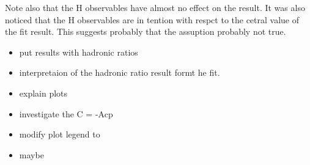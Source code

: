 Note also that the H observables have almost no effect on the result.
It was also noticed that the H observables are in tention with respct to the cetral value of the fit result.
This suggests probably that the assuption \equref{} probably not true.

\begin{itemize}
  \item put results with hadronic ratios
  \item interpretaion of the hadronic ratio result formt he fit.
  \item explain plots
  \item investigate the C = -Acp
  \item modify plot legend to
  \item maybe
\end{itemize}

